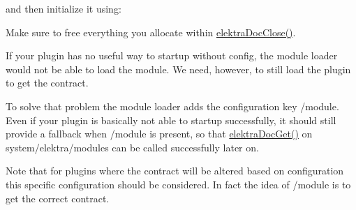 \begin{DoxyCodeInclude}{0}
\DoxyCodeLine{\textcolor{keyword}{typedef} \textcolor{keyword}{struct}}
\DoxyCodeLine{\{}
\end{DoxyCodeInclude}
 and then initialize it using\+:


\begin{DoxyCodeInclude}{0}
\DoxyCodeLine{\{}
\DoxyCodeLine{}
\end{DoxyCodeInclude}
 Make sure to free everything you allocate within \mbox{\hyperlink{group__plugin_ga1236aefe5b2baf8b7bf636ba5aa9ea29}{elektra\+Doc\+Close()}}.

If your plugin has no useful way to startup without config, the module loader would not be able to load the module. We need, however, to still load the plugin to get the contract.

To solve that problem the module loader adds the configuration key /module. Even if your plugin is basically not able to startup successfully, it should still provide a fallback when /module is present, so that \mbox{\hyperlink{group__plugin_gacb69f3441c6d84241b4362f958fbe313}{elektra\+Doc\+Get()}} on system/elektra/modules can be called successfully later on.


\begin{DoxyCodeInclude}{0}
\DoxyCodeLine{        \{}
\DoxyCodeLine{        \}}
\DoxyCodeLine{        \textcolor{comment}{// do some setup that will fail without configuration}}
\end{DoxyCodeInclude}
 Note that for plugins where the contract will be altered based on configuration this specific configuration should be considered. In fact the idea of /module is to get the correct contract.


